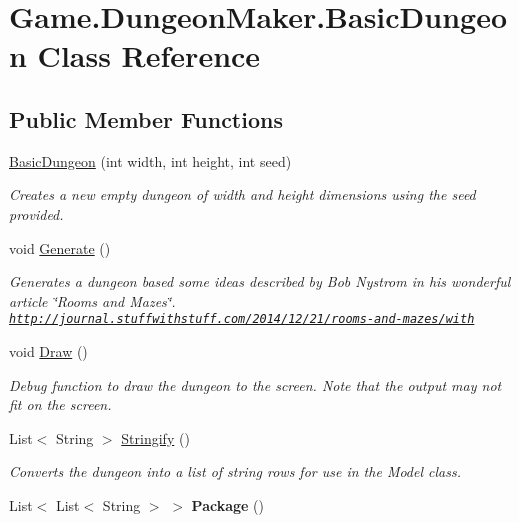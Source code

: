 \hypertarget{class_game_1_1_dungeon_maker_1_1_basic_dungeon}{}\section{Game.\+Dungeon\+Maker.\+Basic\+Dungeon Class Reference}
\label{class_game_1_1_dungeon_maker_1_1_basic_dungeon}
\subsection*{Public Member Functions}
\begin{DoxyCompactItemize}
\item 
\mbox{\hyperlink{class_game_1_1_dungeon_maker_1_1_basic_dungeon_ae506d27631fab15f71cac7b3f20936c7}{Basic\+Dungeon}} (int width, int height, int seed)
\begin{DoxyCompactList}\small\item\em Creates a new empty dungeon of width and height dimensions using the seed provided. \end{DoxyCompactList}\item 
void \mbox{\hyperlink{class_game_1_1_dungeon_maker_1_1_basic_dungeon_ad9b7fb9bf2e0cdf3abfe49140168685e}{Generate}} ()
\begin{DoxyCompactList}\small\item\em Generates a dungeon based some ideas described by Bob Nystrom in his wonderful article \char`\"{}\+Rooms and Mazes\char`\"{}. \href{http://journal.stuffwithstuff.com/2014/12/21/rooms-and-mazes/with}{\tt http\+://journal.\+stuffwithstuff.\+com/2014/12/21/rooms-\/and-\/mazes/with} \end{DoxyCompactList}\item 
void \mbox{\hyperlink{class_game_1_1_dungeon_maker_1_1_basic_dungeon_a2cf2d36643ff09242016a187bf29dcdf}{Draw}} ()
\begin{DoxyCompactList}\small\item\em Debug function to draw the dungeon to the screen. Note that the output may not fit on the screen. \end{DoxyCompactList}\item 
List$<$ String $>$ \mbox{\hyperlink{class_game_1_1_dungeon_maker_1_1_basic_dungeon_a5ea4d65fbdf434976300b6e655d8b8d0}{Stringify}} ()
\begin{DoxyCompactList}\small\item\em Converts the dungeon into a list of string rows for use in the {\ttfamily Model} class. \end{DoxyCompactList}\item 
\mbox{\label{class_game_1_1_dungeon_maker_1_1_basic_dungeon_a4c460b2fbd9124ebad23ea425e0f94d0}} 
List$<$ List$<$ String $>$ $>$ {\bfseries Package} ()
\end{DoxyCompactItemize}


